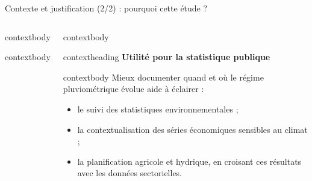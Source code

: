 \documentclass[aspectratio=169,11pt]{beamer}
\begin{document}
\begin{frame}{Contexte et justification (2/2) : pourquoi cette étude ?}
\begin{columns}[T,onlytextwidth]
\begin{beamercolorbox}[wd=\linewidth,rounded=true,sep=0pt]{contextbody}
\begin{beamercolorbox}[wd=\linewidth,sep=0.01cm]{contextbody}
        \end{beamercolorbox}
      \end{beamercolorbox}
      \begin{beamercolorbox}[wd=\linewidth,rounded=true,sep=0pt]{contextbody}
        \begin{beamercolorbox}[wd=\linewidth,ht=0.40cm,dp=0.08cm,leftskip=0.16cm]{contextheading}
          \small\bfseries Utilité pour la statistique publique
        \end{beamercolorbox}
        \begin{beamercolorbox}[wd=\linewidth,sep=0.14cm]{contextbody}
          \small
          Mieux documenter \textcolor{marine}{quand} et \textcolor{marine}{où} le régime pluviométrique évolue aide à éclairer :
          \vspace*{0.10cm}
          \begin{itemize}
            \setlength\itemsep{0.12cm}
            \item le suivi des statistiques environnementales ;
            \item la contextualisation des séries économiques sensibles au climat ;
            \item la planification agricole et hydrique, en croisant ces résultats avec les données sectorielles.
          \end{itemize}
        \end{beamercolorbox}
      \end{beamercolorbox}
  \end{columns}
\end{frame}
\end{document}
